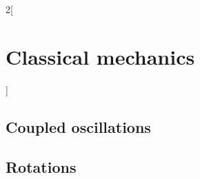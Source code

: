 \documentclass[../../../main.tex]{subfiles}
\begin{document}
\begin{multicols}{2}[\section{Classical mechanics}]
  \subsection{Coupled oscillations}

  \subsection{Rotations}
\end{multicols}
\end{document}
